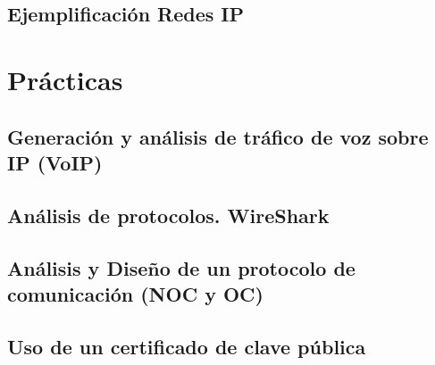 \documentclass[a4paper]{book}
\begin{document}
\section{Ejemplificación Redes IP}





\chapter{Prácticas}

\section{Generación y análisis de tráfico de voz sobre IP (VoIP)}

\section{Análisis de protocolos. WireShark}

\section{ Análisis y Diseño de un protocolo de comunicación (NOC y OC)}

\section{Uso de un certificado de clave pública}



% 
\end{document}
